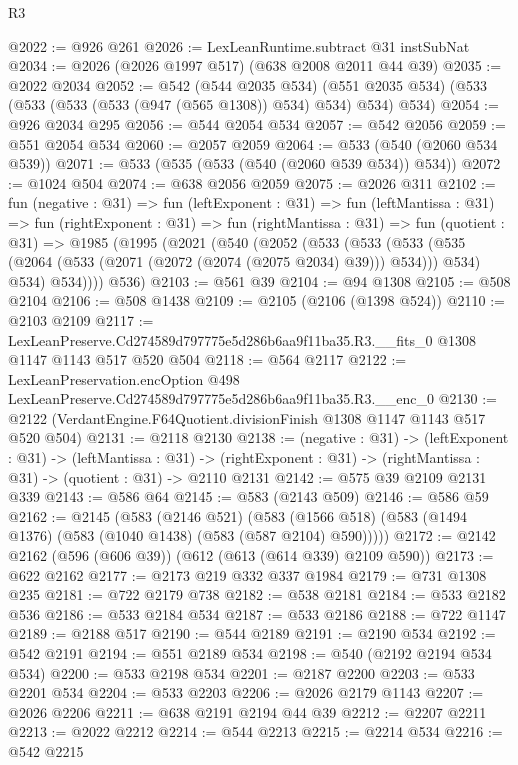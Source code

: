 \begin{lexlean}{R3}
\begin{coremodule}
@2022 := @926 @261
@2026 := LexLeanRuntime.subtract @31 instSubNat
@2034 := @2026 (@2026 @1997 @517) (@638 @2008 @2011 @44 @39)
@2035 := @2022 @2034
@2052 := @542
    (@544 @2035 @534)
    (@551 @2035 @534)
    (@533 (@533 (@533 (@533 (@947 (@565 @1308)) @534) @534) @534) @534)
@2054 := @926 @2034 @295
@2056 := @544 @2054 @534
@2057 := @542 @2056
@2059 := @551 @2054 @534
@2060 := @2057 @2059
@2064 := @533 (@540 (@2060 @534 @539))
@2071 := @533 (@535 (@533 (@540 (@2060 @539 @534)) @534))
@2072 := @1024 @504
@2074 := @638 @2056 @2059
@2075 := @2026 @311
@2102 := fun (negative : @31) =>
  fun (leftExponent : @31) =>
  fun (leftMantissa : @31) =>
  fun (rightExponent : @31) =>
  fun (rightMantissa : @31) =>
  fun (quotient : @31) =>
  @1985
    (@1995
      (@2021
        (@540
          (@2052
            (@533
              (@533
                (@533 (@535 (@2064 (@533 (@2071 (@2072 (@2074 (@2075 @2034) @39))) @534))) @534)
                @534)
              @534))))
      @536)
@2103 := @561 @39
@2104 := @94 @1308
@2105 := @508 @2104
@2106 := @508 @1438
@2109 := @2105 (@2106 (@1398 @524))
@2110 := @2103 @2109
@2117 := LexLeanPreserve.Cd274589d797775e5d286b6aa9f11ba35.R3.__fits_0
    @1308
    @1147
    @1143
    @517
    @520
    @504
@2118 := @564 @2117
@2122 := LexLeanPreservation.encOption
    @498
    LexLeanPreserve.Cd274589d797775e5d286b6aa9f11ba35.R3.__enc_0
@2130 := @2122 (VerdantEngine.F64Quotient.divisionFinish @1308 @1147 @1143 @517 @520 @504)
@2131 := @2118 @2130
@2138 := (negative : @31) ->
  (leftExponent : @31) ->
  (leftMantissa : @31) ->
  (rightExponent : @31) -> (rightMantissa : @31) -> (quotient : @31) -> @2110 @2131
@2142 := @575 @39 @2109 @2131 @339
@2143 := @586 @64
@2145 := @583 (@2143 @509)
@2146 := @586 @59
@2162 := @2145
    (@583
      (@2146 @521)
      (@583 (@1566 @518) (@583 (@1494 @1376) (@583 (@1040 @1438) (@583 (@587 @2104) @590)))))
@2172 := @2142 @2162 (@596 (@606 @39)) (@612 (@613 (@614 @339) @2109 @590))
@2173 := @622 @2162
@2177 := @2173 @219 @332 @337 @1984
@2179 := @731 @1308 @235
@2181 := @722 @2179 @738
@2182 := @538 @2181
@2184 := @533 @2182 @536
@2186 := @533 @2184 @534
@2187 := @533 @2186
@2188 := @722 @1147
@2189 := @2188 @517
@2190 := @544 @2189
@2191 := @2190 @534
@2192 := @542 @2191
@2194 := @551 @2189 @534
@2198 := @540 (@2192 @2194 @534 @534)
@2200 := @533 @2198 @534
@2201 := @2187 @2200
@2203 := @533 @2201 @534
@2204 := @533 @2203
@2206 := @2026 @2179 @1143
@2207 := @2026 @2206
@2211 := @638 @2191 @2194 @44 @39
@2212 := @2207 @2211
@2213 := @2022 @2212
@2214 := @544 @2213
@2215 := @2214 @534
@2216 := @542 @2215

\end{coremodule}
\end{lexlean}
